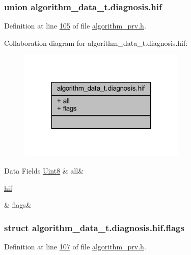 \subsubsection{union algorithm\+\_\+data\+\_\+t.\+diagnosis.\+hif}


Definition at line \hyperlink{a00016_source_l00105}{105} of file \hyperlink{a00016_source}{algorithm\+\_\+prv.\+h}.



Collaboration diagram for algorithm\+\_\+data\+\_\+t.\+diagnosis.\+hif\+:\nopagebreak
\begin{figure}[H]
\begin{center}
\leavevmode
\includegraphics[width=226pt]{da/dd6/a00896}
\end{center}
\end{figure}
\begin{DoxyFields}{Data Fields}
\hypertarget{a00016_aa181a603769c1f98ad927e7367c7aa51}{\hyperlink{a00072_af84840501dec18061d18a68c162a8fa2}{Uint8}}\label{a00016_aa181a603769c1f98ad927e7367c7aa51}
&
all&
\\
\hline

\hypertarget{a00016_a4e5868d676cb634aa75b125a0f741abf}{\hyperlink{a00016_d0/dc2/a00104}{hif}}\label{a00016_a4e5868d676cb634aa75b125a0f741abf}
&
flags&
\\
\hline

\end{DoxyFields}
\label{d0/dc2/a00104}
\hypertarget{a00016_d0/dc2/a00104}{}
\subsubsection{struct algorithm\+\_\+data\+\_\+t.\+diagnosis.\+hif.\+flags}


Definition at line \hyperlink{a00016_source_l00107}{107} of file \hyperlink{a00016_source}{algorithm\+\_\+prv.\+h}.



